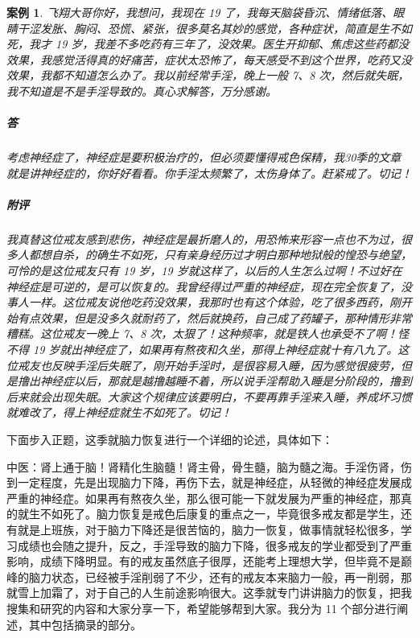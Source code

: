 \documentclass{ctexart}
\newtheorem{case}{案例}
\begin{document}
\begin{case}
    飞翔大哥你好，我想问，我现在 19 了，我每天脑袋昏沉、情绪低落、眼睛干涩发胀、胸闷、恐慌、紧张，很多莫名其妙的感觉，各种症状，简直是生不如死，我才 19 岁，我差不多吃药有三年了，没效果。医生开抑郁、焦虑这些药都没效果，我感觉活得真的好痛苦，症状太恐怖了，每天感受不到这个世界，吃药又没效果，我都不知道怎么办了。我以前经常手淫，晚上一般 7、8 次，然后就失眠，我不知道是不是手淫导致的。真心求解答，万分感谢。
    \subparagraph{答} 考虑神经症了，神经症是要积极治疗的，但必须要懂得戒色保精，我30季的文章就是讲神经症的，你好好看看。你手淫太频繁了，太伤身体了。赶紧戒了。切记！
    \subparagraph{附评} 我真替这位戒友感到悲伤，神经症是最折磨人的，用恐怖来形容一点也不为过，很多人都想自杀，的确生不如死，只有亲身经历过才明白那种地狱般的惶恐与绝望，可怜的是这位戒友只有 19 岁，19 岁就这样了，以后的人生怎么过啊！不过好在神经症是可逆的，是可以恢复的。我曾经得过严重的神经症，现在完全恢复了，没事人一样。这位戒友说他吃药没效果，我那时也有这个体验，吃了很多西药，刚开始有点效果，但是没多久就耐药了，然后就换药，自己成了药罐子，那种情形非常糟糕。这位戒友一晚上 7、8 次，太狠了！这种频率，就是铁人也承受不了啊！怪不得 19 岁就出神经症了，如果再有熬夜和久坐，那得上神经症就十有八九了。这位戒友也反映手淫后失眠了，刚开始手淫时，是很容易入睡，因为感觉很疲劳，但是撸出神经症以后，那就是越撸越睡不着，所以说手淫帮助入睡是分阶段的，撸到后来就会出现失眠。大家这个规律应该要明白，不要再靠手淫来入睡，养成坏习惯就难改了，得上神经症就生不如死了。切记！
\end{case}

下面步入正题，这季就脑力恢复进行一个详细的论述，具体如下：

中医：肾上通于脑！肾精化生脑髓！肾主骨，骨生髓，脑为髓之海。手淫伤肾，伤到一定程度，先是出现脑力下降，再伤下去，就是神经症，从轻微的神经症发展成严重的神经症。如果再有熬夜久坐，那么很可能一下就发展为严重的神经症，那真的就生不如死了。脑力恢复是戒色后康复的重点之一，毕竟很多戒友都是学生，还有就是上班族，对于脑力下降还是很苦恼的，脑力一恢复，做事情就轻松很多，学习成绩也会随之提升，反之，手淫导致的脑力下降，很多戒友的学业都受到了严重影响，成绩下降明显。有的戒友虽然底子很厚，还能考上理想大学，但毕竟不是巅峰的脑力状态，已经被手淫削弱了不少，还有的戒友本来脑力一般，再一削弱，那就雪上加霜了，对于自己的人生前途影响很大。这季就专门讲讲脑力的恢复，把我搜集和研究的内容和大家分享一下，希望能够帮到大家。我分为 11 个部分进行阐述，其中包括摘录的部分。
\end{document}
